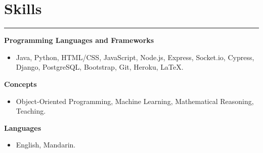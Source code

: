\documentclass[10pt]{article}
\newcommand{\resumesection}[1]{\vspace{-0.2cm}\section*{#1}\vspace{-0.2cm}\hrule\vspace{0.2cm}}
\begin{document}
\resumesection{Skills}

\textbf{Programming Languages and Frameworks}
\begin{itemize}
	\item Java, Python, HTML/CSS, JavaScript, Node.js, Express, Socket.io, Cypress, Django, PostgreSQL, Bootstrap, Git, Heroku, \LaTeX.
\end{itemize}

\textbf{Concepts}
\begin{itemize}
	\item Object-Oriented Programming, Machine Learning, Mathematical Reasoning, Teaching.
\end{itemize}

\textbf{Languages}
\begin{itemize}
	\item English, Mandarin.
\end{itemize}
\end{document}
